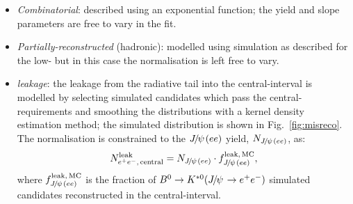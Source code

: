 \begin{itemize}

\item \textit{Combinatorial}: described using an exponential function;
the yield and slope parameters are free to vary in the fit.

\item \textit{Partially-reconstructed} (hadronic): modelled using simulation as described for the low-\qsq 
but in this case the normalisation is left free to vary.

%
%

\item \textit{\BdToKstJPs leakage}: the leakage from the \jpsi radiative tail into the central-\qsq interval is modelled by selecting 
simulated \BdToKstJPsee candidates which pass the central-\qsq requirements and smoothing the distributions
with a kernel density estimation method; the simulated distribution is shown in Fig.~\ref{fig:misreco}. The normalisation is constrained 
to the $\jpsi(ee)$ yield, $N_{\jpsi (ee)}$, as:
%
$$N_{\ee, \, {\rm central}}^{\rm leak} = N_{\jpsi(ee)} \cdot f_{\jpsi(ee)}^{\rm leak, \,MC},$$
%
where $f_{\jpsi(ee)}^{\rm leak, \,MC}$ is the fraction of $\Bd\to\Kstarz(\jpsi\to\ee)$ simulated candidates reconstructed
in the central-\qsq interval.

\end{itemize}

